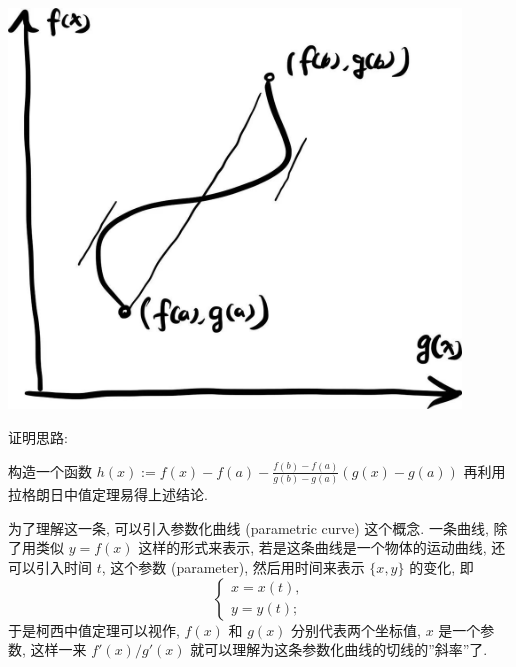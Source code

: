 \begin{tcolorbox}[size=fbox, breakable, enhanced jigsaw, title={柯西中值定理 (Cauchy's mean value theorem)}]



\begin{tcolorbox}[size=fbox, breakable, enhanced jigsaw, sidebyside]
\includegraphics[width=0.9\textwidth]{img/image-20230615082658188.png}
\tcblower
{}
\end{tcolorbox}

\begin{newquote}
证明思路:

构造一个函数 $h(x):=f(x)-f(a)-\frac{f(b)-f(a)}{g(b)-g(a)}(g(x)-g(a))$
再利用拉格朗日中值定理易得上述结论.
\end{newquote}

为了理解这一条, 可以引入参数化曲线 (parametric curve) 这个概念.
一条曲线, 除了用类似 $y=f(x)$ 这样的形式来表示,
若是这条曲线是一个物体的运动曲线, 还可以引入时间 $t$, 这个参数
(parameter), 然后用时间来表示 $\{x,y\}$ 的变化, 即 \[
\begin{cases}
x=x(t),\\
y=y(t);
\end{cases}
\] 于是柯西中值定理可以视作, $f(x)$ 和 $g(x)$ 分别代表两个坐标值,
$x$ 是一个参数, 这样一来 $f'(x)/g'(x)$
就可以理解为这条参数化曲线的切线的''斜率''了.

\end{tcolorbox}

